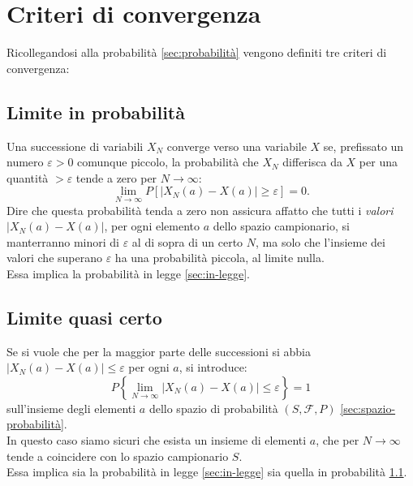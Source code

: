 \chapter{Criteri di convergenza} %
\label{cha:criteri-convergenza}
Ricollegandosi alla probabilità \ref{sec:probabilità} vengono definiti tre criteri di convergenza:
\section{Limite in probabilità} %
\label{sec:lim-probabilità}
Una successione di variabili $X_N$ converge verso una variabile $X$ se, prefissato un numero $\varepsilon >0$ comunque piccolo, la probabilità che $X_N$ differisca da $X$ per una quantità $>\varepsilon$ tende a zero per $N\rightarrow \infty $:
\begin{equation}
\lim _{ N\rightarrow \infty  }{ P\left[ \left| { X }_{ N }\left( a \right) -X\left( a \right)  \right| \ge \varepsilon  \right] }=0 .
\end{equation}
Dire che questa probabilità tenda a zero non assicura affatto che tutti i \emph{valori} $\left| { X }_{ N }\left( a \right) -X\left( a \right)  \right| $, per ogni elemento $a$ dello spazio campionario, si manterranno minori di $\varepsilon$ al di sopra di un certo $N$, ma solo che l'insieme dei valori che superano $\varepsilon$ ha una probabilità piccola, al limite nulla. \\ Essa implica la probabilità in legge \ref{sec:in-legge}.

\section{Limite quasi certo} %
\label{sec:lim-quasi-certo}
Se si vuole che per la maggior parte delle successioni si abbia $\left| { X }_{ N }\left( a \right) -X\left( a \right)  \right| \le \varepsilon $ per ogni $a$, si introduce:
\begin{equation}
P\left\{ \lim _{ N\rightarrow \infty  }{ \left| { X }_{ N }\left( a \right) -X\left( a \right)  \right| \le \varepsilon  }  \right\} =1
\end{equation}
sull'insieme degli elementi $a$ dello spazio di probabilità $(S,\mathcal{F},P)$ \ref{sec:spazio-probabilità}. \\In questo caso siamo sicuri che esista un insieme di elementi $a$, che per $N\rightarrow \infty $ tende a coincidere con lo spazio campionario $S$. \\ Essa implica sia la probabilità in legge \ref{sec:in-legge} sia quella in probabilità \ref{sec:lim-probabilità}.

